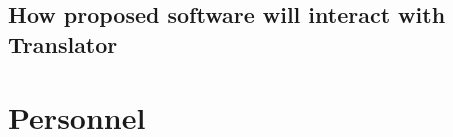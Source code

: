 \documentclass[11pt,notitlepage]{article}
\begin{document}
\subsection{How proposed software will interact with Translator}



\section{Personnel}



\end{document}
